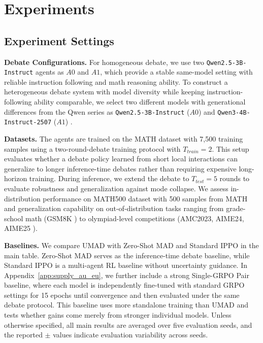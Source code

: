 \documentclass{article}
\theoremstyle{plain}
\theoremstyle{definition}
\theoremstyle{remark}
\begin{document}
\section{Experiments}
\label{sec:experiments}

\subsection{Experiment Settings}
\textbf{Debate Configurations.} 
For homogeneous debate, we use two \texttt{Qwen2.5-3B-Instruct} agents as $A0$ and $A1$, which provide a stable same-model setting with reliable instruction following and math reasoning ability. To construct a heterogeneous debate system with model diversity while keeping instruction-following ability comparable, we select two different models with generational differences from the Qwen series as \texttt{Qwen2.5-3B-Instruct} ($A0$) and \texttt{Qwen3-4B-Instruct-2507} ($A1$) \cite{yang2024qwen2,yang2025qwen3}. 

\textbf{Datasets.} The agents are trained on the MATH dataset \cite{hendrycks2021measuring} with 7,500 training samples using a two-round-debate training protocol with $T_{train}=2$. This setup evaluates whether a debate policy learned from short local interactions can generalize to longer inference-time debates rather than requiring expensive long-horizon training. During inference, we extend the debate to $T_{test}=5$ rounds to evaluate robustness and generalization against mode collapse. We assess in-distribution performance on MATH500 dataset with 500 samples from MATH and generalization capability on out-of-distribution tasks ranging from grade-school math (GSM8K \cite{cobbe2021training}) to olympiad-level competitions (AMC2023, AIME24, AIME25 \cite{amc2023,aops_aime_2024, aops_aime_2025}).



\textbf{Baselines.} 
We compare UMAD with Zero-Shot MAD and Standard IPPO in the main table. Zero-Shot MAD serves as the inference-time debate baseline, while Standard IPPO is a multi-agent RL baseline without uncertainty guidance. In Appendix~\ref{app:supply_au_eu}, we further include a strong Single-GRPO Pair baseline, where each model is independently fine-tuned with standard GRPO settings for 15 epochs until convergence and then evaluated under the same debate protocol. This baseline uses more standalone training than UMAD and tests whether gains come merely from stronger individual models. Unless otherwise specified, all main results are averaged over five evaluation seeds, and the reported $\pm$ values indicate evaluation variability across seeds.
\end{document}
